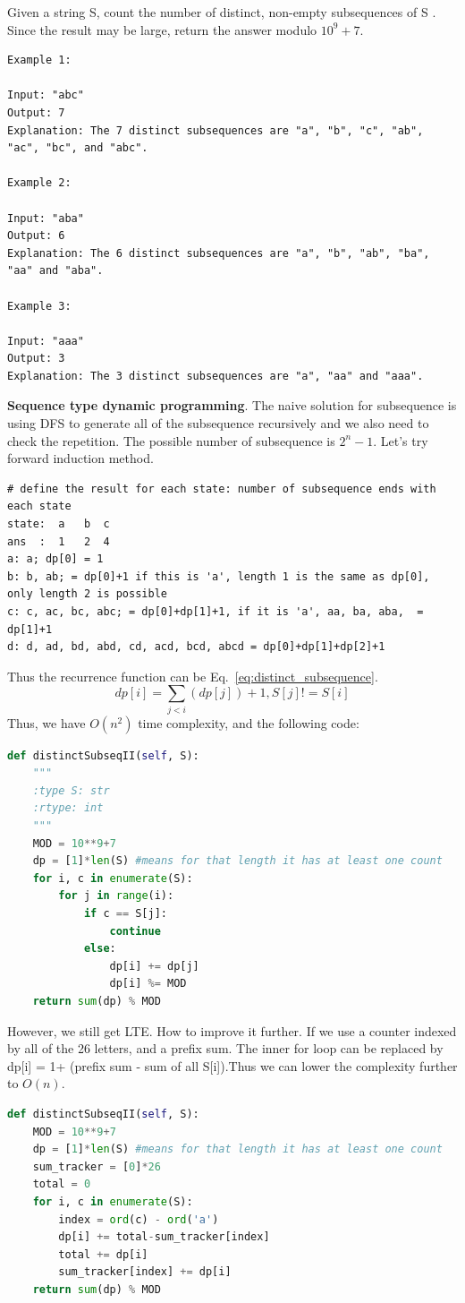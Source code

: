 \documentclass[../../../main.tex]{subfiles}
\begin{document}
Given a string S, count the number of distinct, non-empty subsequences of S . Since the result may be large, return the answer modulo $10^9 + 7$.
\begin{lstlisting}
Example 1:

Input: "abc"
Output: 7
Explanation: The 7 distinct subsequences are "a", "b", "c", "ab", "ac", "bc", and "abc".

Example 2:

Input: "aba"
Output: 6
Explanation: The 6 distinct subsequences are "a", "b", "ab", "ba", "aa" and "aba".

Example 3:

Input: "aaa"
Output: 3
Explanation: The 3 distinct subsequences are "a", "aa" and "aaa".
\end{lstlisting}
\textbf{Sequence type dynamic programming}. The naive solution for subsequence is using DFS to generate all of the subsequence recursively and we also need to check the repetition. The possible number of subsequence is $2^n-1$. Let's try forward induction method. 
\begin{lstlisting}
# define the result for each state: number of subsequence ends with each state
state:  a   b  c
ans  :  1   2  4 
a: a; dp[0] = 1
b: b, ab; = dp[0]+1 if this is 'a', length 1 is the same as dp[0], only length 2 is possible
c: c, ac, bc, abc; = dp[0]+dp[1]+1, if it is 'a', aa, ba, aba,  = dp[1]+1
d: d, ad, bd, abd, cd, acd, bcd, abcd = dp[0]+dp[1]+dp[2]+1
\end{lstlisting}
Thus the recurrence function can be Eq.~\ref{eq:distinct_subsequence}.
\begin{equation}
\label{eq:distinct_subsequence}
    dp[i] = \sum_{j<i}(dp[j]) +1, S[j] != S[i]
\end{equation}
Thus, we have $O(n^2)$ time complexity, and the following code:
\begin{lstlisting}[language=Python]
def distinctSubseqII(self, S):
    """
    :type S: str
    :rtype: int
    """
    MOD = 10**9+7
    dp = [1]*len(S) #means for that length it has at least one count
    for i, c in enumerate(S):
        for j in range(i):
            if c == S[j]:
                continue
            else:
                dp[i] += dp[j]
                dp[i] %= MOD
    return sum(dp) % MOD
\end{lstlisting}
However, we still get LTE. How to improve it further. If we use a counter indexed by all of the 26 letters, and a prefix sum. The inner for loop can be replaced by dp[i] = 1+ (prefix sum - sum of all S[i]).Thus we can lower the complexity further to $O(n)$.
\begin{lstlisting}[language=Python]
def distinctSubseqII(self, S):
    MOD = 10**9+7
    dp = [1]*len(S) #means for that length it has at least one count
    sum_tracker = [0]*26
    total = 0
    for i, c in enumerate(S):
        index = ord(c) - ord('a')
        dp[i] += total-sum_tracker[index]
        total += dp[i]
        sum_tracker[index] += dp[i]
    return sum(dp) % MOD
\end{lstlisting}
\end{document}
